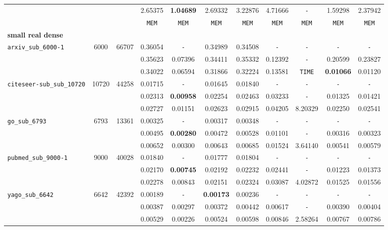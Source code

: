\begin{table}
{\begin{tabular}{ l c c | c c c c c c c c }
 &  &  & 2.65375 & \textbf{1.04689} & 2.69332 & 3.22876 & 4.71666 & \verb|-| & 1.59298 & 2.37942 \\
 &  &  & \verb|MEM| & \verb|MEM| & \verb|MEM| & \verb|MEM| & \verb|MEM| & \verb|MEM| & \verb|MEM| & \verb|MEM| \\
\hline
\multicolumn{11}{l}{\textbf{small real dense}} \\
\hline
\verb|arxiv_sub_6000-1| & 6000 & 66707 & 0.36054 & \verb|-| & 0.34989 & 0.34508 & \verb|-| & \verb|-| & \verb|-| & \verb|-| \\
 &  &  & 0.35623 & 0.07396 & 0.34411 & 0.35332 & 0.12392 & \verb|-| & 0.20599 & 0.23827 \\
 &  &  & 0.34022 & 0.06594 & 0.31866 & 0.32224 & 0.13581 & \verb|TIME| & \textbf{0.01066} & 0.01120 \\
\hline
\verb|citeseer-sub_sub_10720| & 10720 & 44258 & 0.01715 & \verb|-| & 0.01645 & 0.01840 & \verb|-| & \verb|-| & \verb|-| & \verb|-| \\
 &  &  & 0.02313 & \textbf{0.00958} & 0.02254 & 0.02463 & 0.03233 & \verb|-| & 0.01325 & 0.01421 \\
 &  &  & 0.02727 & 0.01151 & 0.02623 & 0.02915 & 0.04205 & 8.20329 & 0.02250 & 0.02541 \\
\hline
\verb|go_sub_6793| & 6793 & 13361 & 0.00325 & \verb|-| & 0.00317 & 0.00348 & \verb|-| & \verb|-| & \verb|-| & \verb|-| \\
 &  &  & 0.00495 & \textbf{0.00280} & 0.00472 & 0.00528 & 0.01101 & \verb|-| & 0.00316 & 0.00323 \\
 &  &  & 0.00652 & 0.00300 & 0.00643 & 0.00685 & 0.01524 & 3.64140 & 0.00541 & 0.00579 \\
\hline
\verb|pubmed_sub_9000-1| & 9000 & 40028 & 0.01840 & \verb|-| & 0.01777 & 0.01804 & \verb|-| & \verb|-| & \verb|-| & \verb|-| \\
 &  &  & 0.02170 & \textbf{0.00745} & 0.02192 & 0.02232 & 0.02441 & \verb|-| & 0.01223 & 0.01373 \\
 &  &  & 0.02278 & 0.00843 & 0.02151 & 0.02324 & 0.03087 & 4.02872 & 0.01525 & 0.01556 \\
\hline
\verb|yago_sub_6642| & 6642 & 42392 & 0.00189 & \verb|-| & \textbf{0.00173} & 0.00236 & \verb|-| & \verb|-| & \verb|-| & \verb|-| \\
 &  &  & 0.00387 & 0.00297 & 0.00372 & 0.00442 & 0.00617 & \verb|-| & 0.00390 & 0.00404 \\
 &  &  & 0.00529 & 0.00226 & 0.00524 & 0.00598 & 0.00846 & 2.58264 & 0.00767 & 0.00786 \\
\hline
  \end{tabular}
}
\end{table}

